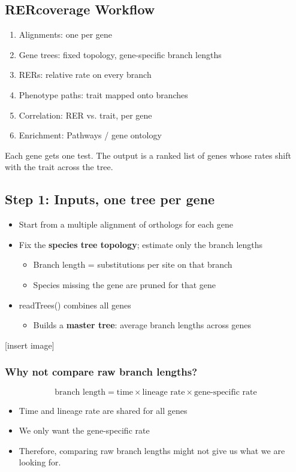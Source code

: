 \documentclass[10pt]{article}
\begin{document}
\subsection*{RERcoverage Workflow}
\begin{enumerate}
    \item Alignments: one per gene
    \item Gene trees: fixed topology, gene-specific branch lengths
    \item RERs: relative rate on every branch
    \item Phenotype paths: trait mapped onto branches
    \item Correlation: RER vs. trait, per gene
    \item Enrichment: Pathways / gene ontology
\end{enumerate}
Each gene gets one test.  The output is a ranked list of genes whose rates shift with the trait across the tree.

\subsection*{Step 1: Inputs, one tree per gene}
\begin{itemize}
    \item Start from a multiple alignment of orthologs for each gene
    \item Fix the \textbf{species tree topology}; estimate only the branch lengths
    \begin{itemize}
        \item Branch length = substitutions per site on that branch
        \item Species missing the gene are pruned for that gene
    \end{itemize}
    \item readTrees() combines all genes
    \begin{itemize}
        \item Builds a \textbf{master tree}: average branch lengths across genes
    \end{itemize}
\end{itemize}
[insert image]

\subsubsection*{Why not compare raw branch lengths?}
\[\text{branch length} = \text{time} \times \text{lineage rate} \times \text{gene-specific rate}\]
\begin{itemize}
    \item Time and lineage rate are shared for all genes
    \item We only want the gene-specific rate
    \item Therefore, comparing raw branch lengths might not give us what we are looking for.
\end{itemize}
\end{document}
